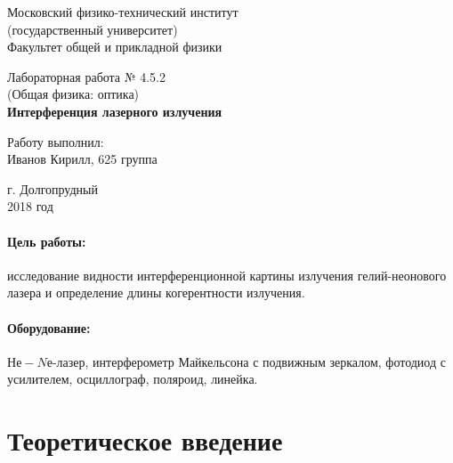 \documentclass[12pt]{kiarticle}
\begin{document}
	
	\begin{titlepage}
	\begin{center}
		\large 	Московский физико-технический институт \\
		(государственный университет) \\
		Факультет общей и прикладной физики \\
		\vspace{0.2cm}
		
		\vspace{4.5cm}
		Лабораторная работа № 4.5.2 \\ \vspace{0.2cm}
		\large (Общая физика: оптика) \\ \vspace{0.2cm}
		\LARGE \textbf{Интерференция лазерного излучения}
	\end{center}
	\vspace{2.3cm} \large
	
	\begin{center}
		Работу выполнил: \\
		Иванов Кирилл,
		625 группа
		\vspace{10mm}		
		
	\end{center}
	
	\begin{center} \vspace{60mm}
		г. Долгопрудный \\
		2018 год
	\end{center}
\end{titlepage}
	
	\paragraph*{Цель работы:} исследование видности интерференционной картины излучения гелий-неонового лазера и определение длины когерентности излучения.
	
	\paragraph*{Оборудование:}  $Не-Nе$-лазер, интерферометр Майкельсона с подвижным зеркалом, фотодиод с усилителем, осциллограф, поляроид, линейка.
	
	\section{Теоретическое введение}
	
\end{document}
